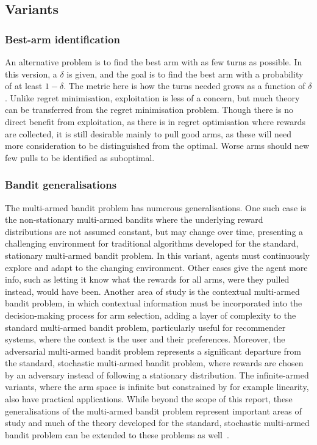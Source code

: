 \subsection{Variants}
\subsubsection{Best-arm identification}
An alternative problem is to find the best arm with as few turns as possible.
In this version, a $\delta$ is given, and the goal is to find the best arm with a probability of at least $1-\delta$.
The metric here is how the turns needed grows as a function of $\delta$.
Unlike regret minimisation, exploitation is less of a concern, but much theory can be transferred from the regret minimisation problem.
Though there is no direct benefit from exploitation, as there is in regret optimisation where rewards are collected, it is still desirable mainly to pull good arms, as these will need more consideration to be distinguished from the optimal.
Worse arms should new few pulls to be identified as suboptimal.

\subsubsection{Bandit generalisations}
The multi-armed bandit problem has numerous generalisations.
One such case is the non-stationary multi-armed bandits where the underlying reward distributions are not assumed constant, but may change over time, presenting a challenging environment for traditional algorithms developed for the standard, stationary multi-armed bandit problem.
In this variant, agents must continuously explore and adapt to the changing environment.
Other cases give the agent more info, such as letting it know what the rewards for all arms, were they pulled instead, would have been.
Another area of study is the contextual multi-armed bandit problem, in which contextual information must be incorporated into the decision-making process for arm selection, adding a layer of complexity to the standard multi-armed bandit problem, particularly useful for recommender systems, where the context is the user and their preferences.
Moreover, the adversarial multi-armed bandit problem represents a significant departure from the standard, stochastic multi-armed bandit problem, where rewards are chosen by an adversary instead of following a stationary distribution.
The infinite-armed variants, where the arm space is infinite but constrained by for example linearity, also have practical applications.
While beyond the scope of this report, these generalisations of the multi-armed bandit problem represent important areas of study and much of the theory developed for the standard, stochastic multi-armed bandit problem can be extended to these problems as well~\autocite{slivkins2019,lattimore2020}.


